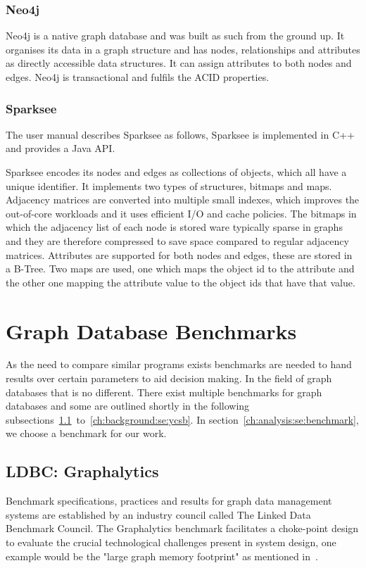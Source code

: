 \subsubsection{Neo4j}
Neo4j is a native graph database and was built as such from the ground up.
It organises its data in a graph structure and has nodes, relationships and attributes as directly accessible data structures.
It can assign attributes to both nodes and edges.
Neo4j is transactional and fulfils the ACID properties.~\cite{Neo4jInc.2006}

\subsubsection{Sparksee}
The user manual describes Sparksee as follows, 
Sparksee is implemented in C++ and provides a Java API.

Sparksee encodes its nodes and edges as collections of objects, which all have a unique identifier.
It implements two types of structures, bitmaps and maps.
Adjacency matrices are converted into multiple small indexes,
which improves the out-of-core workloads and it uses efficient I/O and cache policies.
The bitmaps in which the adjacency list of each node is stored ware typically sparse in graphs and they are therefore compressed to save space compared to regular adjacency matrices.
Attributes are supported for both nodes and edges,
these are stored in a B-Tree.
Two maps are used, one which maps the object id to the attribute and the other one mapping the attribute value to the object ids that have that value.~\cite{TaoShen}

\section{Graph Database Benchmarks}
\label{ch:background:se:graphDatabaseBenchmarks}
As the need to compare similar programs exists benchmarks are needed to hand results over certain parameters to aid decision making.
In the field of graph databases that is no different.
There exist multiple benchmarks for graph databases and some are outlined shortly in the following subsections~\ref{ch:background:se:ldbcGraphalytics}~to~\ref{ch:background:se:ycsb}.
In section~\ref{ch:analysis:se:benchmark},
we choose a benchmark for our work.

\subsection{LDBC: Graphalytics}
\label{ch:background:se:ldbcGraphalytics}
Benchmark specifications, practices and results for graph data management systems are established by an industry council called The Linked Data Benchmark Council.
The Graphalytics benchmark facilitates a choke-point design to evaluate the crucial technological challenges present in system design,
one example would be the "large graph memory footprint" as mentioned in~\cite[2]{Capota2015c}.

